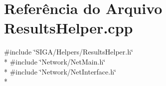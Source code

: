 \section{Referência do Arquivo Results\+Helper.\+cpp}
\label{_results_helper_8cpp}
{\ttfamily \#include \char`\"{}S\+I\+G\+A/\+Helpers/\+Results\+Helper.\+h\char`\"{}}\\*
{\ttfamily \#include \char`\"{}Network/\+Net\+Main.\+h\char`\"{}}\\*
{\ttfamily \#include \char`\"{}Network/\+Net\+Interface.\+h\char`\"{}}\\*
